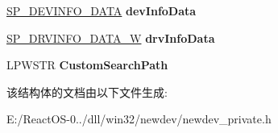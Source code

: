 \begin{DoxyCompactItemize}
\hyperlink{struct___s_p___d_e_v_i_n_f_o___d_a_t_a}{S\+P\+\_\+\+D\+E\+V\+I\+N\+F\+O\+\_\+\+D\+A\+TA} {\bfseries dev\+Info\+Data}
\item 
\mbox{\label{struct___d_e_v_i_n_s_t_d_a_t_a_a5d93233172835949fab870ddd8a3f661}} 
\hyperlink{struct___s_p___d_r_v_i_n_f_o___d_a_t_a___v2___w}{S\+P\+\_\+\+D\+R\+V\+I\+N\+F\+O\+\_\+\+D\+A\+T\+A\+\_\+W} {\bfseries drv\+Info\+Data}
\item 
\mbox{\label{struct___d_e_v_i_n_s_t_d_a_t_a_a898c291a0eb052d5858dcdc43c17bbf3}} 
L\+P\+W\+S\+TR {\bfseries Custom\+Search\+Path}
\end{DoxyCompactItemize}


该结构体的文档由以下文件生成\+:\begin{DoxyCompactItemize}
\item 
E\+:/\+React\+O\+S-\/0../dll/win32/newdev/newdev\+\_\+private.\+h\end{DoxyCompactItemize}
